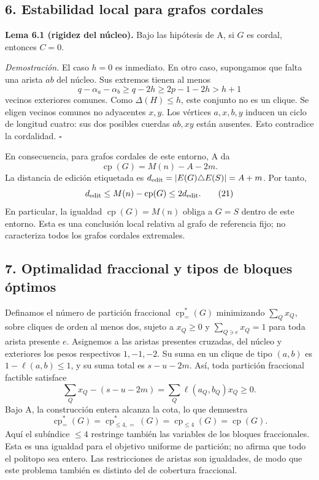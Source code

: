 \documentclass[spanish,11pt,a4paper]{article}
\begin{document}
\subsection{6. Estabilidad local para grafos
cordales}\label{estabilidad-local-para-grafos-cordales}

\textbf{Lema 6.1 (rigidez del núcleo).} Bajo las hipótesis de A, si
\(G\) es cordal, entonces \(C=0\).

\emph{Demostración.} El caso \(h=0\) es inmediato. En otro caso,
supongamos que falta una arista \(ab\) del núcleo. Sus extremos tienen
al menos \[
q-\alpha_a-\alpha_b\ge q-2h\ge2p-1-2h>h+1
\] vecinos exteriores comunes. Como \(\Delta(H)\le h\), este conjunto no
es un clique. Se eligen vecinos comunes no adyacentes \(x,y\). Los
vértices \(a,x,b,y\) inducen un ciclo de longitud cuatro: sus dos
posibles cuerdas \(ab,xy\) están ausentes. Esto contradice la
cordalidad. \(\square\)

En consecuencia, para grafos cordales de este entorno, A da \[
\operatorname{cp}(G)=M(n)-A-2m. \tag{20}
\] La distancia de edición etiquetada es
\(d_{\rm edit}=|E(G)\triangle E(S)|=A+m\). Por tanto, \[
d_{\rm edit}\le M(n)-\operatorname{cp}(G)\le2d_{\rm edit}. \tag{21}
\] En particular, la igualdad \(\operatorname{cp}(G)=M(n)\) obliga a
\(G=S\) dentro de este entorno. Esta es una conclusión local relativa al
grafo de referencia fijo; no caracteriza todos los grafos cordales
extremales.

\subsection{7. Optimalidad fraccional y tipos de bloques
óptimos}\label{optimalidad-fraccional-y-tipos-de-bloques-uxf3ptimos}

Definamos el número de partición fraccional
\(\operatorname{cp}_{=}^{*}(G)\) minimizando \(\sum_Q x_Q\), sobre
cliques de orden al menos dos, sujeto a \(x_Q\ge0\) y
\(\sum_{Q\ni e}x_Q=1\) para toda arista presente \(e\). Asignemos a las
aristas presentes cruzadas, del núcleo y exteriores los pesos
respectivos \(1,-1,-2\). Su suma en un clique de tipo \((a,b)\) es
\(1-\ell(a,b)\le1\), y su suma total es \(s-u-2m\). Así, toda partición
fraccional factible satisface \[
\sum_Qx_Q-(s-u-2m)=\sum_Q\ell(a_Q,b_Q)x_Q\ge0.
\] Bajo A, la construcción entera alcanza la cota, lo que demuestra \[
\operatorname{cp}_{=}^{*}(G)=\operatorname{cp}_{\le4,=}^{*}(G)
=\operatorname{cp}_{\le4}(G)=\operatorname{cp}(G). \tag{22}
\] Aquí el subíndice \(\le4\) restringe también las variables de los
bloques fraccionales. Esta es una igualdad para el objetivo uniforme de
partición; no afirma que todo el politopo sea entero. Las restricciones
de aristas son igualdades, de modo que este problema también es distinto
del de cobertura fraccional.
\end{document}
